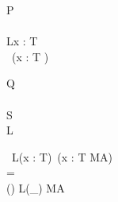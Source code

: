 \begin{zed}[T]\end{zed}
\begin{circus}
\circprocess P\circdef\\
 \circbegin\\
 L\circdef \circvar x : T \circspot \Skip\\
 ~\circspot (\circvar x : T \circspot \Skip) 
 \circend
\end{circus}
\begin{circus}
\circprocess Q\circdef\\ \circbegin\\ \circstate S \\ L \circdef \Skip \circspot \Skip \circend
\end{circus}

\circbegin~L(x : T)~\circspot (\circvar x : T \circspot MA) \circend
\\=\\
\circbegin (\circstate [ x : T ]) L(_) \circspot MA \circend